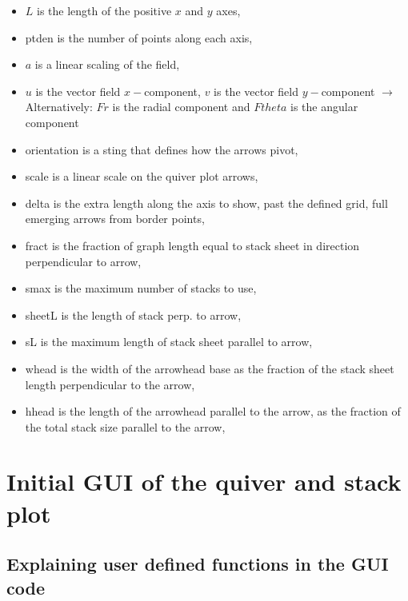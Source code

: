 \documentclass[11]{report}
\begin{document}
\begin{itemize}
	\item $L$ is the length of the positive $x$ and $y$ axes,
	\item pt\textunderscore den is the number of points along each axis,
	\item $a$ is a linear scaling of the field,	
	\item $u$ is the vector field $x-$component, $v$ is the vector field $y-$component $\longrightarrow$  Alternatively: $Fr$ is the radial component and $Ftheta$ is the angular component
	\item orientation is a sting that defines how the arrows pivot,
	\item scale is a linear scale on the quiver plot arrows,
	\item delta is the extra length along the axis to show, past the defined grid, full emerging arrows from border points,
	\item fract is the fraction of graph length equal to stack sheet in direction perpendicular to arrow,
	\item s\textunderscore max is the maximum number of stacks to use,
	\item sheet\textunderscore L is the length of stack perp. to arrow,
	\item s\textunderscore L is the maximum length of stack sheet parallel to arrow,
	\item w\textunderscore head is the width of the arrowhead base as the fraction of the stack sheet length perpendicular to the arrow,
	\item h\textunderscore head is the length of the arrowhead parallel to the arrow, as the fraction of the total stack size parallel to the arrow,

\end{itemize}


\section{Initial GUI of the quiver and stack plot}

\subsection{Explaining user defined functions in the GUI code}
\end{document}
